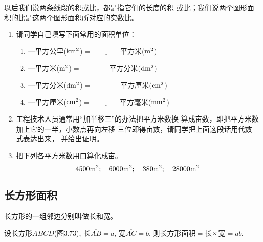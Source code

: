 以后我们说两条线段的积或比，都是指它们的长度的积
或比；我们说两个图形面积的比是这两个图形面积所对应的实数比。

\begin{ex}
\begin{enumerate}
    \item 请同学自己填写下面常用的面积单位：
\begin{enumerate}
\item     一平方公里($\rm km^2$)$=\underline{\qquad\qquad}$平方米($\rm m^2$)
\item     一平方米($\rm m^2$)$=\underline{\qquad\qquad}$平方分米($\rm dm^2$)
\item    一平方分米($\rm dm^2$)$=\underline{\qquad\qquad}$平方厘米($\rm cm^2$)
\item 一平方厘米($\rm cm^2$)$=\underline{\qquad\qquad}$平方毫米($\rm mm^2$)
\end{enumerate}

    \item 工程技术人员通常用“加半移三”的办法把平方米数换
    算成亩数，即把平方米数加上它的一半，小数点再向左移
    三位即得亩数，请同学把上面这段话用代数式表达出来，
    并给出证明。
    \item 把下列各平方米数用口算化成亩。
\[ 4500{\rm m^2};\quad     6000{\rm m^2};\quad     380{\rm m^2};
 \quad    28000{\rm m^2}\]
\end{enumerate}
\end{ex}

\subsection{长方形面积}
长方形的一组邻边分别叫做长和宽。

设长方形$ABCD$(图3.73), 长$\overline{AB}=a$, 宽$\overline{AC}=b$, 
则长方形面积$=$长$\times$宽$=ab$.

\begin{figure}[htp]
    \centering
{}
    \caption{}
\end{figure}


